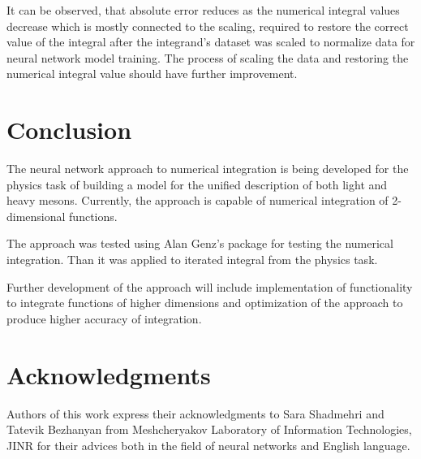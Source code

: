 \documentclass[%
]{ittmm}
\begin{document}
It can be observed, that absolute error reduces as the numerical integral values decrease which is mostly connected to the scaling, required to restore the correct value of the integral after the integrand's dataset was scaled to normalize data for neural network model training. The process of scaling the data and restoring the numerical integral value should have further improvement. 

\section{Conclusion}

The neural network approach to numerical integration is being developed for the physics task of building a model for the unified description of both light and heavy mesons. Currently, the approach is capable of numerical integration of 2-dimensional functions.

The approach was tested using Alan Genz's package for testing the numerical integration. Than it was applied to iterated integral from the physics task.

Further development of the approach will include implementation of functionality to integrate functions of higher dimensions and optimization of the approach to produce higher accuracy of integration.

\section{Acknowledgments}

Authors of this work express their acknowledgments to Sara Shadmehri and Tatevik Bezhanyan from Meshcheryakov Laboratory of Information Technologies, JINR for their advices both in the field of neural networks and English language.


\end{document}
